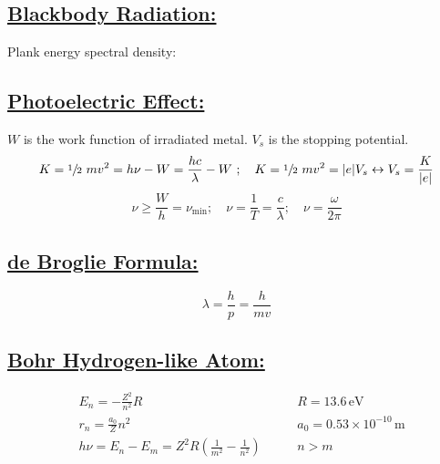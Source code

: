 \documentclass[a4paper,12pt]{article}
\begin{document}
\subsection*{\underline{Blackbody Radiation:}}
Plank energy spectral density: 
\vspace{0.3cm}
\subsection*{\underline{Photoelectric Effect:}}
$W$ is the work function of irradiated metal. $V_s$ is the stopping potential.
$$K=\sfrac{1}{2}\ mv^2=h\nu-W=\frac{hc}{\lambda}-W\ ;\quad K=\sfrac{1}{2}\ mv^2=|e|V_s\leftrightarrow V_s=\frac{K}{|e|}$$
$$\nu\geq\frac{W}{h}=\nu_{\min};\quad \nu=\frac{1}{T}=\frac{c}{\lambda};\quad \nu=\frac{\omega}{2\pi}$$
\subsection*{\underline{de Broglie Formula:}}
$$\lambda=\frac{h}{p}=\frac{h}{mv}$$
\vspace{0.3cm}
\subsection*{\underline{Bohr Hydrogen-like Atom:}}
\begin{align*}
    &E_n=-\frac{Z^2}{n^2}R&\ &\quad R=13.6\,\unit{\electronvolt}\\
    &r_n=\frac{a_0}{Z}n^2&\ &\quad a_0=0.53\times10^{-10}\,\unit{\metre}\\
    &h\nu=E_n-E_m=Z^2R\left( \frac{1}{m^2}-\frac{1}{n^2} \right)&\ &\quad n>m
\end{align*}
\end{document}
